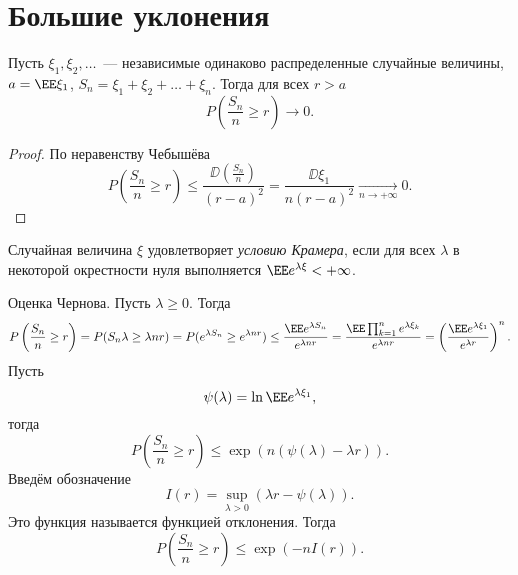\section{Большие уклонения}

\begin{theorem} Пусть
    $\xi_1, \xi_2, \ldots$~--- независимые одинаково распределенные случайные величины,
    $a = \EE  \xi_1$, $S_n = \xi_1 + \xi_2 + \ldots + \xi_n$. Тогда для всех $ r > a $ $$
    P\left(\frac{S_n}{n} \ge r\right) \to 0.$$
\end{theorem}

\begin{proof}
По неравенству Чебышёва
    $$P\left(\frac{S_n}{n} \ge r\right) \le \frac{\DD\left(\tfrac{S_n}{n}\right)}{(r - a)^2} = \frac{\DD \xi_1}{n(r-a)^2} \underset{n \to +\infty}{\to} 0 .$$
\end{proof}

\begin{definition}
    Случайная величина $\xi$ удовлетворяет \textit{условию Крамера}, если для всех $\lambda$ в некоторой окрестности нуля выполняется
    $\EE  e^{\lambda \xi} < +\infty$.
\end{definition}

Оценка Чернова. Пусть $\lambda \ge 0$. Тогда
    $$P\left(\frac{S_n}{n} \ge r\right) = P(S_n \lambda \ge \lambda n r) = P(e^{\lambda S_n} \ge e^{\lambda n r}) \le
    \frac{\EE  e^{\lambda S_n}}{e^{\lambda n r}} = \frac{\EE  \prod_{k = 1}^{n} e^{\lambda \xi_k}}{e^{\lambda n r}} = \left ( \frac{\EE  e^{\lambda \xi_1}}{e^{\lambda r}} \right )^n.$$
    Пусть 
    $$\psi(\lambda) = \ln \EE  e^{\lambda \xi_1},$$
    тогда 
    $$P\left(\frac{S_n}{n} \ge r\right) \le \exp(n (\psi(\lambda) - \lambda r)).$$
    Введём обозначение
    $$I(r) = \sup \limits_{\lambda > 0} (\lambda r - \psi(\lambda)).$$ Это функция называется функцией отклонения. Тогда 
    $$P\left(\frac{S_n}{n} \ge r\right) \le \exp(-nI(r)).$$


